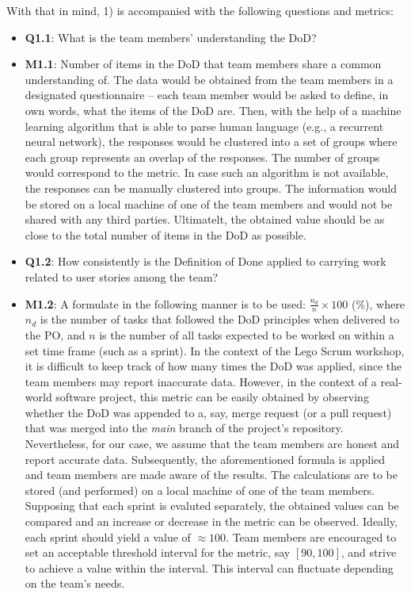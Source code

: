 \documentclass[conference]{IEEEtran}
\begin{document}
With that in mind, 1) is accompanied with the following questions and metrics:

\begin{itemize}
  \item \textbf{Q1.1}: What is the team members' understanding the DoD?
  \item \textbf{M1.1}: Number of items in the DoD that team members share a
    common understanding of. The data would be obtained from the team members
    in a designated questionnaire -- each team member would be asked to define,
    in own words, what the items of the DoD are. Then, with the help of a
    machine learning algorithm that is able to parse human language (e.g., a
    recurrent neural network), the responses would be clustered into a set of
    groups where each group represents an overlap of the responses. The number
    of groups would correspond to the metric. In case such an algorithm is not
    available, the responses can be manually clustered into groups. The
    information would be stored on a local machine of one of the team members
    and would not be shared with any third parties. Ultimatelt, the obtained
    value should be as close to the total number of items in the DoD as
    possible.
  \item \textbf{Q1.2}: How consistently is the Definition of Done applied to
    carrying work related to user stories among the team?
  \item \textbf{M1.2}: A formulate in the following manner is to be used:
    $\frac{n_d}{n} \times 100$ (\%), where $n_d$ is the number of tasks that
    followed the DoD principles when delivered to the PO, and $n$ is the number
    of all tasks expected to be worked on within a set time frame (such as a
    sprint). In the context of the Lego Scrum workshop, it is difficult to keep
    track of how many times the DoD was applied, since the team members may
    report inaccurate data. However, in the context of a real-world software
    project, this metric can be easily obtained by observing whether the DoD
    was appended to a, say, merge request (or a pull request) that was merged into
    the \textit{main} branch of the project's repository. Nevertheless, for our case, we
    assume that the team members are honest and report accurate data.
    Subsequently, the aforementioned formula is applied and team members are
    made aware of the results. The calculations are to be stored (and
    performed) on a local machine of one of the team members. Supposing that
    each sprint is evaluted separately, the obtained values can be compared and
    an increase or decrease in the metric can be observed. Ideally, each sprint
    should yield a value of $\approx 100$. Team members are encouraged to set
    an acceptable threshold interval for the metric, say $[90, 100]$, and
    strive to achieve a value within the interval. This interval can fluctuate
    depending on the team's needs.
\end{itemize}
\end{document}
